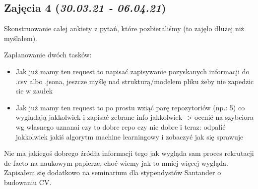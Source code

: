 \documentclass[graybox]{svmult}
\begin{document}
\subsection{Zajęcia 4 (\emph{30.03.21 - 06.04.21})}

Skonstruowanie całej ankiety z pytań, które pozbieraliśmy (to zajęło dłużej niż myślałem).

Zaplanowanie dwóch tasków:
\begin{itemize}
  \item Jak już mamy ten request to napisać zapisywanie pozyskanych informacji do .csv albo .jsona, jeszcze myślę nad strukturą/modelem pliku żeby nie zapedzic sie w zaułek
  \item Jak już mamy ten request to po prostu wziąć parę repozytoriów (np.: 5) co wyglądają jakkolwiek i zapisać zebrane info jakkolwiek -> ocenić na szybciora wg wlasnego uznanai czy to dobre repo czy nie dobre i teraz: odpalić jakkolwiek jakiś algorytm machine learningowy i zobaczyć jak się sprawuje
\end{itemize}
Nie ma jakiegoś dobrego źródła informacji tego jak wygląda sam proces rekrutacji de-facto na naukowym papierze, choć wiemy jak to mniej więcej wygląda. Zapisałem się dodatkowo na seminarium dla stypendystów Santander o budowaniu CV.
\end{document}
